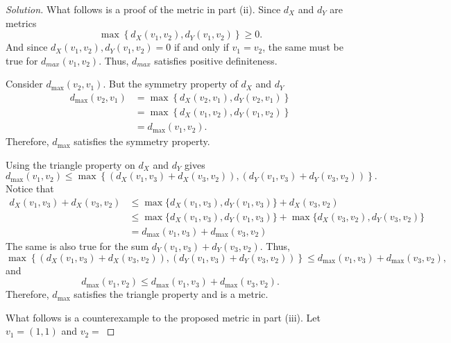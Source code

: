\documentclass[11pt,letterpaper]{article}
\newcommand{\R}{\mathbb{R}}
\newenvironment{prob}[1]
  {\renewcommand\theinnerprob{#1}\innerprob}
  {\endinnerprob}
\newenvironment{solution}
  {\renewcommand\qedsymbol{}\begin{proof}[Solution]}
  {\end{proof}\bigskip}
\begin{document}
\begin{solution}
	What follows is a proof of the metric in part (ii). Since $d_X$ and $d_Y$ are metrics $$\max\left\{ d_X(v_1,v_2), d_Y(v_1,v_2)\right\} \geq 0.$$ And since $d_X(v_1,v_2), d_Y(v_1,v_2) = 0$ if and only if $v_1 = v_2$, the same must be true for $d_{max}(v_1,v_2)$. Thus, $d_{max}$ satisfies positive definiteness.
	
	Consider $d_{\max}(v_2,v_1)$. But the symmetry property of $d_X$ and $d_Y$
	\[\begin{split}
		d_{\max}(v_2,v_1) &= \max\left\{ d_X(v_2,v_1), d_Y(v_2,v_1)\right\}\\
		&=\max\left\{ d_X(v_1,v_2), d_Y(v_1,v_2)\right\}\\
		&= d_{\max}(v_1,v_2).
	\end{split}\] Therefore, $d_{\max}$ satisfies the symmetry property.
	
	Using the triangle property on $d_X$ and $d_Y$ gives $$d_{\max}(v_1,v_2) \leq \max\left\{\left ( d_X(v_1,v_3) + d_X(v_3,v_2) \right ), \left ( d_Y(v_1,v_3) + d_Y(v_3,v_2)\right ) \right \}.$$ Notice that 
	\[\begin{split}
		d_X(v_1,v_3) + d_X(v_3,v_2) &\leq \max\{d_X(v_1,v_3), d_Y(v_1,v_3)\} + d_X(v_3,v_2)\\
		&\leq \max\{d_X(v_1,v_3), d_Y(v_1,v_3)\} + \max\{d_X(v_3,v_2), d_Y(v_3,v_2)\}\\
		&= d_{\max}(v_1,v_3) + d_{\max}(v_3,v_2)
	\end{split}\] The same is also true for the sum $d_Y(v_1,v_3) + d_Y(v_3,v_2)$. Thus, 
	$$ \max\left\{\left ( d_X(v_1,v_3) + d_X(v_3,v_2) \right ), \left ( d_Y(v_1,v_3) + d_Y(v_3,v_2)\right ) \right \} \leq d_{\max}(v_1,v_3) + d_{\max}(v_3,v_2),$$ and $$
	d_{\max}(v_1,v_2) \leq d_{\max}(v_1,v_3) + d_{\max}(v_3,v_2).$$ Therefore, $d_{\max}$ satisfies the triangle property and is a metric. 
	
	What follows is a counterexample to the proposed metric in part (iii). Let $v_1 = (1,1)$ and $v_2 = $
	 
\end{solution}
\newpage



%
%
\end{document}
